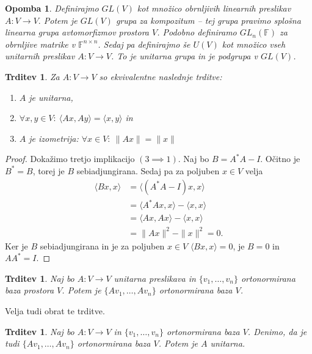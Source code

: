 \documentclass[10pt, a4paper]{article}
\newtheorem{trditev}[izr]{Trditev}
\newtheorem*{opomba}{Opomba}
\newenvironment{noticeC}{%
  \tcolorbox[%
  notitle,
  empty,
  enhanced,  %
  breakable,
  coltext=black, 
  fontupper=\rmfamily,
  parbox=false,
  noparskip,
  sharp corners,
  boxrule=-1pt,  %
  frame hidden,
  left=7pt,  %
  right=7pt,
  top=5pt,
  bottom=5pt,
  before skip=2.5ex plus 2pt,
  after skip=2.5ex plus 2pt,
  overlay unbroken and last={%
  },
  ]}
{\endtcolorbox}
\newenvironment{dokaz}%
  {\begin{noticeC}\begin{proof}}%
  {\end{proof}\end{noticeC}}
\newcommand{\F}{\mathbb {F}}
\newcommand{\sprod}[2]{\langle {#1},{#2} \rangle}
\begin{document}
\begin{opomba}
    Definirajmo $GL(V)$ kot množico obrnljivih linearnih preslikav $A: V \rightarrow V.$
    Potem je $GL(V)$ grupa za kompozitum -- tej grupa pravimo splošna linearna grupa avtomorfizmov prostora $V$.
    Podobno definiramo $GL_n (\F)$ za obrnljive matrike v $\F^{n \times n}$.
    Sedaj pa definirajmo še $U(V)$ kot množico vseh unitarnih preslikav $A: V \rightarrow V$.
    To je unitarna grupa in je podgrupa v $GL(V)$.
\end{opomba}

\begin{trditev}
    Za $A: V \rightarrow V$ so ekvivalentne naslednje trditve:
    \begin{enumerate}
        \item $A$ je unitarna,
        \item $\forall x,y \in V:\ \sprod{Ax}{Ay} = \sprod{x}{y}$ in 
        \item $A$ je izometrija: $\forall x \in V:\ \|Ax\| = \|x\|$
    \end{enumerate}
\end{trditev}

\begin{dokaz}
    Dokažimo tretjo implikacijo $(3 \implies 1)$.
    Naj bo $B = A^* A - I$. Očitno je $B^* = B$, torej je $B$ sebiadjungirana.
    Sedaj pa za poljuben $x \in V$ velja 
    \begin{align*}
        \sprod{Bx}{x} &= \sprod{(A^*A - I)x}{x}\\
        &= \sprod{A^* Ax}{x} - \sprod{x}{x}\\
        &= \sprod{Ax}{Ax} - \sprod{x}{x}\\
        &= \|Ax\|^2 - \|x\|^2 = 0.
    \end{align*}
    Ker je $B$ sebiadjungirana in je za poljuben $x \in V$ $\sprod{Bx}{x} = 0$, je $B = 0$ in $A A^* = I$.
\end{dokaz}

\begin{trditev}
    Naj bo $A: V \rightarrow V$ unitarna preslikava in $\{v_1, \dots, v_n\}$
    ortonormirana baza prostora $V$. Potem je $\{Av_1, \dots, A v_n\}$ ortonormirana baza $V$.
\end{trditev}

Velja tudi obrat te trditve.

\begin{trditev}
    Naj bo $A: V \rightarrow V$ in $\{v_1, \dots, v_n\}$ ortonormirana baza $V$.
    Denimo, da je tudi $\{A v_1, \dots, A v_n\}$ ortonormirana baza $V$.
    Potem je $A$ unitarna.
\end{trditev}
\end{document}
